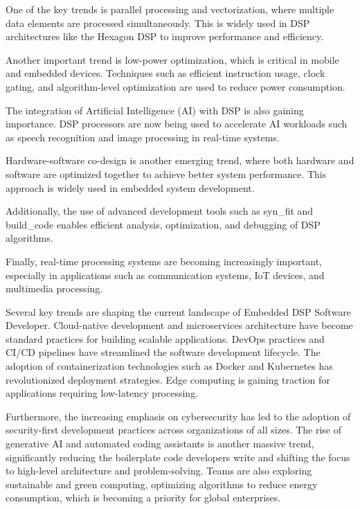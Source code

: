 \documentclass[12pt,a4paper]{report}
\begin{document}
One of the key trends is parallel processing and vectorization, where multiple data elements are processed simultaneously. This is widely used in DSP architectures like the Hexagon DSP to improve performance and efficiency.


Another important trend is low-power optimization, which is critical in mobile and embedded devices. Techniques such as efficient instruction usage, clock gating, and algorithm-level optimization are used to reduce power consumption.


The integration of Artificial Intelligence (AI) with DSP is also gaining importance. DSP processors are now being used to accelerate AI workloads such as speech recognition and image processing in real-time systems.


Hardware-software co-design is another emerging trend, where both hardware and software are optimized together to achieve better system performance. This approach is widely used in embedded system development.


Additionally, the use of advanced development tools such as syn\_fit and build\_code enables efficient analysis, optimization, and debugging of DSP algorithms.


Finally, real-time processing systems are becoming increasingly important, especially in applications such as communication systems, IoT devices, and multimedia processing.

Several key trends are shaping the current landscape of Embedded DSP Software Developer. Cloud-native development and microservices architecture have become standard practices for building scalable applications. DevOps practices and CI/CD pipelines have streamlined the software development lifecycle. The adoption of containerization technologies such as Docker and Kubernetes has revolutionized deployment strategies. Edge computing is gaining traction for applications requiring low-latency processing.


Furthermore, the increasing emphasis on cybersecurity has led to the adoption of security-first development practices across organizations of all sizes. The rise of generative AI and automated coding assistants is another massive trend, significantly reducing the boilerplate code developers write and shifting the focus to high-level architecture and problem-solving. Teams are also exploring sustainable and green computing, optimizing algorithms to reduce energy consumption, which is becoming a priority for global enterprises.
\end{document}
